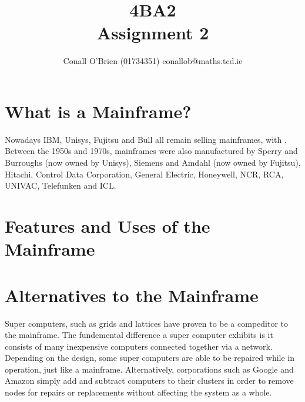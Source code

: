 \documentclass[a4paper,12pt]{article}
\begin{document}


\title{4BA2 \\ Assignment 2}

\author{Conall O'Brien (01734351) conallob@maths.tcd.ie}

\maketitle

\section{What is a Mainframe?}

\cite[Mainframes (often colloquially referred to as big iron) are large and 
"expensive" computers used mainly by government institutions and 
large companies for mission critical applications, typically bulk data 
processing such as censuses, industry/consumer statistics, ERP, and 
financial transaction processing]{m1}


Nowadays IBM, Unisys, Fujitsu and Bull all remain selling mainframes,
with \cite[IBM mainframes dominating the market at over 90\%]{m1}.
Between the 1950s and 1970s, mainframes were also manufactured by 
Sperry and Burroughs (now owned by Unisys), Siemens and Amdahl (now 
owned by Fujitsu), Hitachi, Control Data Corporation, General Electric, 
Honeywell, NCR, RCA, UNIVAC, Telefunken and ICL. \cite [ IBM's 
dominance grew out of their development of the 360 series mainframes; 
this basic architecture has continued to evolve into their current 
zSeries/z9 mainframe, which is arguably the only mainframe architecture 
still extant that dates from this early period.]{m1}

\section{Features and Uses of the Mainframe}

\section{Alternatives to the Mainframe}

Super computers, such as grids and lattices have proven to be a
compeditor to the mainframe. The fundemental difference a super computer
exhibits is it consists of many inexpensive computers connected
together via a network. Depending on the design, some super computers 
are able to be repaired while in operation, just like a mainframe. 
Alternatively, corporations such as Google and Amazon simply add and 
subtract computers to their clusters in order to remove nodes for 
repairs or replacements without affecting the system as a whole.
\end{document}
